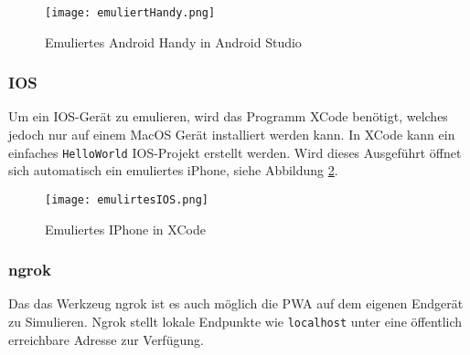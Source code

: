 \begin{figure}[!htb]
    \centering
    \texttt{[image: emuliertHandy.png]}
    \caption {Emuliertes Android Handy in Android Studio}
    \label{Android1}
\end{figure}

\subsubsection{IOS}

Um ein IOS-Gerät zu emulieren, wird das Programm XCode benötigt, welches jedoch nur auf einem MacOS Gerät installiert werden kann. In XCode kann ein einfaches \texttt{HelloWorld} IOS-Projekt erstellt werden. Wird dieses Ausgeführt öffnet sich automatisch ein emuliertes iPhone, siehe Abbildung \ref{img:emuIOS}.

\begin{figure}
    \centering
    \texttt{[image: emulirtesIOS.png]}
    \caption{Emuliertes IPhone in XCode}
    \label{img:emuIOS}
\end{figure}

\subsubsection{ngrok}
Das das Werkzeug ngrok ist es auch möglich die PWA auf dem eigenen Endgerät zu Simulieren. Ngrok stellt lokale Endpunkte wie \texttt{localhost} unter eine öffentlich erreichbare Adresse zur Verfügung.



